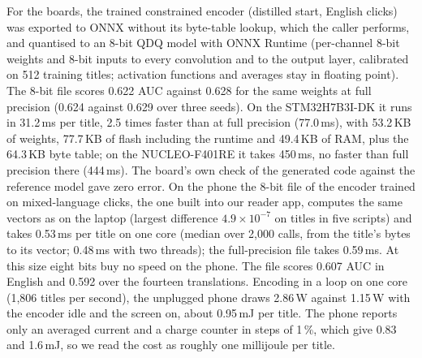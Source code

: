 \documentclass{llncs}
\begin{document}
For the boards, the trained constrained encoder (distilled start, English clicks)
was exported to ONNX without its byte-table lookup, which the caller performs, and
quantised to an 8-bit QDQ model with ONNX Runtime (per-channel 8-bit weights and
8-bit inputs to every convolution and to the output layer, calibrated on 512
training titles; activation functions and averages stay in floating point). The
8-bit file scores 0.622 AUC against 0.628 for the same weights at full precision
(0.624 against 0.629 over three seeds). On the
STM32H7B3I-DK it runs in 31.2\,ms per title, 2.5 times faster than at full
precision (77.0\,ms), with 53.2\,KB of weights, 77.7\,KB of flash including the
runtime and 49.4\,KB of RAM, plus the 64.3\,KB byte table; on the NUCLEO-F401RE it
takes 450\,ms, no faster than full precision there (444\,ms). The board's own check
of the generated code against the reference model gave zero error.
On the phone the 8-bit file of the encoder trained on mixed-language clicks, the
one built into our reader app, computes the same vectors as on the laptop
(largest difference $4.9\times10^{-7}$ on titles in five scripts) and takes
0.53\,ms per title on one core (median over 2,000 calls, from the title's bytes to
its vector; 0.48\,ms with two threads); the full-precision file takes 0.59\,ms.
At this size eight bits buy no speed on the phone. The file scores 0.607 AUC in
English and 0.592 over the fourteen translations. Encoding in a loop on one core
(1,806 titles per second), the unplugged phone draws 2.86\,W against 1.15\,W with
the encoder idle and the screen on, about 0.95\,mJ per title. The phone reports
only an averaged current and a charge counter in steps of 1\,\%, which give 0.83
and 1.6\,mJ, so we read the cost as roughly one millijoule per title.
\end{document}
